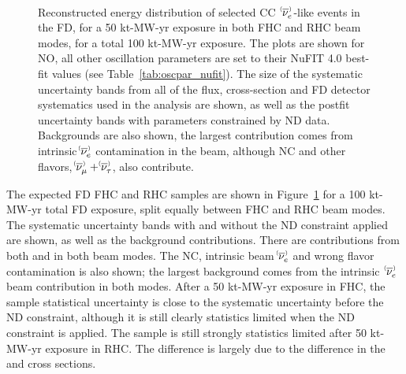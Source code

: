 \begin{figure}[htbp]
 \\
 \caption{Reconstructed energy distribution of selected CC $\;\nue^{\bracketbar}$-like events in the FD, for a 50 kt-MW-yr exposure in both FHC and RHC beam modes, for a total 100 kt-MW-yr exposure. The plots are shown for NO, all other oscillation parameters are set to their NuFIT 4.0 best-fit values (see Table~\ref{tab:oscpar_nufit}). The size of the systematic uncertainty bands from all of the flux, cross-section and FD detector systematics used in the analysis are shown, as well as the postfit uncertainty bands with parameters constrained by ND data. Backgrounds are also shown, the largest contribution comes from intrinsic $\nue^{\bracketbar}$ contamination in the beam, although NC and other flavors, $\numu^{\bracketbar} + \nutau^{\bracketbar}$, also contribute.}
 \label{fig:appspectra}
\end{figure}
The expected FD FHC \nue and RHC \anue samples are shown in Figure~\ref{fig:appspectra} for a 100 kt-MW-yr total FD exposure, split equally between FHC and RHC beam modes. The systematic uncertainty bands with and without the ND constraint applied are shown, as well as the background contributions. There are contributions from both \nue and \anue in both beam modes. The NC, intrinsic beam $\nue^{\bracketbar}$ and wrong flavor contamination is also shown; the largest background comes from the intrinsic $\;\nue^{\bracketbar}$ beam contribution in both modes. After a 50 kt-MW-yr exposure in FHC, the \nue sample statistical uncertainty is close to the systematic uncertainty before the ND constraint, although it is still clearly statistics limited when the ND constraint is applied. The \anue sample is still strongly statistics limited after 50 kt-MW-yr exposure in RHC. The difference is largely due to the difference in the \nue and \anue cross sections. %

